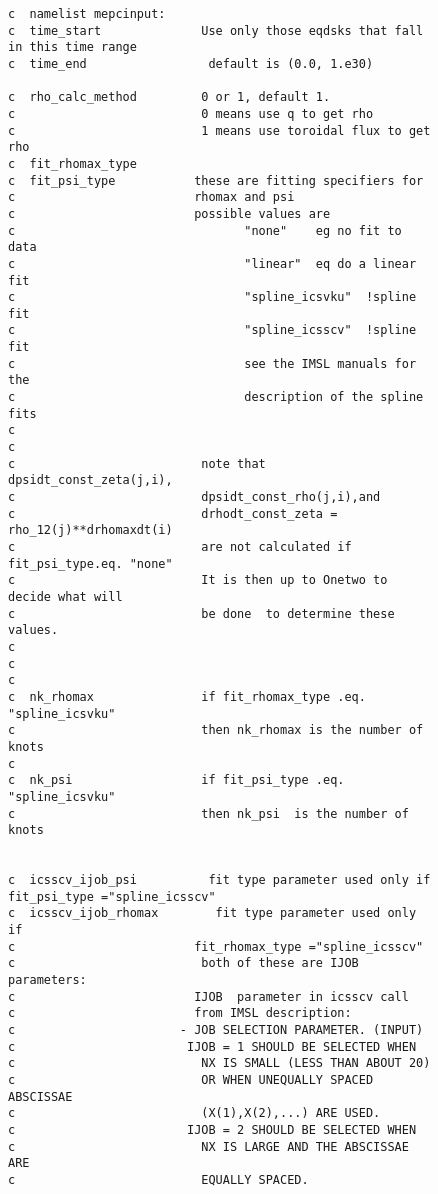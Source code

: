 \begin{figure} 
{
\tiny
\begin{verbatim}
c  namelist mepcinput:
c  time_start              Use only those eqdsks that fall in this time range
c  time_end                 default is (0.0, 1.e30)

c  rho_calc_method         0 or 1, default 1. 
c                          0 means use q to get rho
c                          1 means use toroidal flux to get rho
c  fit_rhomax_type
c  fit_psi_type           these are fitting specifiers for
c                         rhomax and psi
c                         possible values are
c                                "none"    eg no fit to data
c                                "linear"  eq do a linear fit
c                                "spline_icsvku"  !spline fit
c                                "spline_icsscv"  !spline fit
c                                see the IMSL manuals for the
c                                description of the spline fits
c  
c
c                          note that dpsidt_const_zeta(j,i), 
c                          dpsidt_const_rho(j,i),and 
c                          drhodt_const_zeta = rho_12(j)**drhomaxdt(i)
c                          are not calculated if fit_psi_type.eq. "none"
c                          It is then up to Onetwo to decide what will
c                          be done  to determine these values.
c
c
c
c  nk_rhomax               if fit_rhomax_type .eq. "spline_icsvku"
c                          then nk_rhomax is the number of knots
c
c  nk_psi                  if fit_psi_type .eq. "spline_icsvku"
c                          then nk_psi  is the number of knots


c  icsscv_ijob_psi          fit type parameter used only if 
fit_psi_type ="spline_icsscv"
c  icsscv_ijob_rhomax        fit type parameter used only if 
c                         fit_rhomax_type ="spline_icsscv"
c                          both of these are IJOB parameters:
c                         IJOB  parameter in icsscv call       
c                         from IMSL description:
c                       - JOB SELECTION PARAMETER. (INPUT)
c                        IJOB = 1 SHOULD BE SELECTED WHEN
c                          NX IS SMALL (LESS THAN ABOUT 20)
c                          OR WHEN UNEQUALLY SPACED ABSCISSAE
c                          (X(1),X(2),...) ARE USED.
c                        IJOB = 2 SHOULD BE SELECTED WHEN
c                          NX IS LARGE AND THE ABSCISSAE ARE
c                          EQUALLY SPACED.


\end{verbatim}}
\end{figure}
